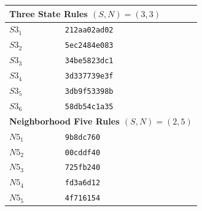 \documentclass{elsarticle}
\begin{document}
\begin{multicols}{2}
	
	\begin{table}[!htbp] \centering
		\small
		\begin{tabular}{|p{2cm}|l|}
			\hline
			\multicolumn{2}{|l|}{\textbf{Three State Rules \boldmath$(S,N) = (3,3)$}} \\ 
			\hline
			$S3_{1}$ & \verb|212aa02ad02|                      \\ \hline
			$S3_{2}$ & \verb|5ec2484e083|                      \\ \hline
			$S3_{3}$ & \verb|34be5823dc1|                      \\ \hline
			$S3_{4}$ & \verb|3d337739e3f|                      \\ \hline
			$S3_{5}$ & \verb|3db9f53398b|                      \\ \hline
			$S3_{6}$ & \verb|58db54c1a35|                      \\ \hline
			\multicolumn{2}{|l|}{\textbf{Neighborhood Five Rules \boldmath$(S,N) = (2,5)$}} 
			\\ \hline
			$N5_{1}$ & \verb|9b8dc760|                         \\ \hline
			$N5_{2}$ & \verb|00cddf40|                         \\ \hline
			$N5_{3}$ & \verb|725fb240|                         \\ \hline
			$N5_{4}$ & \verb|fd3a6d12|                         \\ \hline
			$N5_{5}$ & \verb|4f716154|                         \\ \hline

\end{tabular}
\end{table}
\end{multicols}
\end{document}
